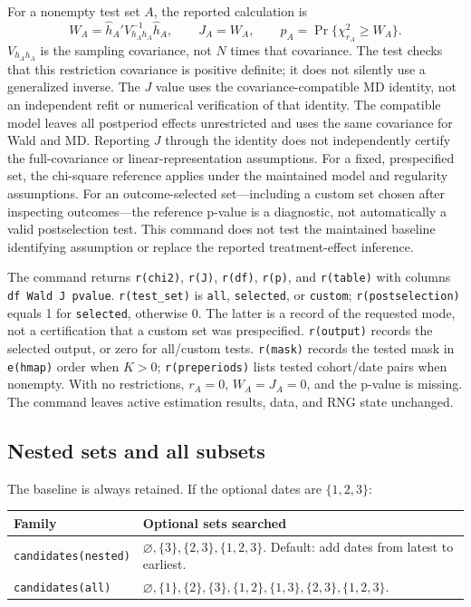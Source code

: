 \documentclass[11pt]{article}
\newcommand{\cmd}[1]{\texttt{#1}}
\begin{document}
For a nonempty test set $A$, the reported calculation is
\[
 W_A=\widehat h_A'V_{h_Ah_A}^{-1}\widehat h_A,
 \qquad J_A=W_A,\qquad
 p_A=\Pr\{\chi^2_{r_A}\geq W_A\}.
\]
$V_{h_Ah_A}$ is the sampling covariance, not $N$ times that covariance.
The test checks that this restriction covariance is positive definite; it
does not silently use a generalized inverse. The $J$ value uses the covariance-compatible MD identity, not an
independent refit or numerical verification of that identity. The compatible
model leaves all postperiod effects unrestricted and uses the same covariance
for Wald and MD. Reporting $J$ through the identity does not independently
certify the full-covariance or linear-representation assumptions. For a fixed,
prespecified set, the chi-square reference applies under the maintained
model and regularity assumptions. For an outcome-selected set---including
a custom set chosen after inspecting outcomes---the reference p-value is a
diagnostic, not automatically a valid postselection test. This command does
not test the maintained baseline identifying assumption or replace the
reported treatment-effect inference.

The command returns \cmd{r(chi2)}, \cmd{r(J)}, \cmd{r(df)}, \cmd{r(p)}, and
\cmd{r(table)} with columns \cmd{df Wald J pvalue}. \cmd{r(test\_set)} is
\cmd{all}, \cmd{selected}, or \cmd{custom}; \cmd{r(postselection)} equals 1
for \cmd{selected}, otherwise 0. The latter is a record of the requested
mode, not a certification that a custom set was prespecified.
\cmd{r(output)} records the selected output, or zero for all/custom tests.
\cmd{r(mask)} records the tested mask in \cmd{e(hmap)} order when $K>0$;
\cmd{r(preperiods)} lists tested cohort/date pairs when nonempty.
With no restrictions, $r_A=0$, $W_A=J_A=0$, and the p-value is missing.
The command leaves active estimation results, data, and RNG state unchanged.

\subsection{Nested sets and all subsets}
The baseline is always retained. If the optional dates are $\{1,2,3\}$:

\begin{tabularx}{\linewidth}{@{}lX@{}}
\toprule
Family & Optional sets searched \\
\midrule
\cmd{candidates(nested)} & $\varnothing,\{3\},\{2,3\},\{1,2,3\}$. Default: add dates from latest to earliest. \\
\cmd{candidates(all)} & $\varnothing,\{1\},\{2\},\{3\},\{1,2\},\{1,3\},\{2,3\},\{1,2,3\}$. \\
\bottomrule
\end{tabularx}
\end{document}
